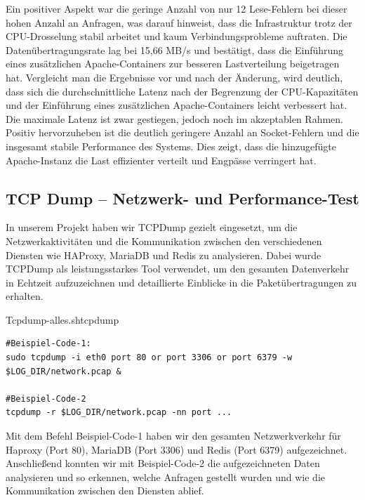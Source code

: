 Ein positiver Aspekt war die geringe Anzahl von nur 12 Lese-Fehlern bei dieser hohen Anzahl an Anfragen, was darauf hinweist, dass die Infrastruktur trotz der CPU-Drosselung stabil arbeitet und kaum Verbindungsprobleme auftraten. Die Datenübertragungsrate lag bei 15,66 MB/s und bestätigt, dass die Einführung eines zusätzlichen Apache-Containers zur besseren Lastverteilung beigetragen hat.
Vergleicht man die Ergebnisse vor und nach der Änderung, wird deutlich, dass sich die durchschnittliche Latenz nach der Begrenzung der CPU-Kapazitäten und der Einführung eines zusätzlichen Apache-Containers leicht verbessert hat. Die maximale Latenz ist zwar gestiegen, jedoch noch im akzeptablen Rahmen. Positiv hervorzuheben ist die deutlich geringere Anzahl an Socket-Fehlern und die insgesamt stabile Performance des Systems. Dies zeigt, dass die hinzugefügte Apache-Instanz die Last effizienter verteilt und Engpässe verringert hat.


\subsection{TCP Dump – Netzwerk- und Performance-Test}
In unserem Projekt haben wir TCPDump gezielt eingesetzt, um die Netzwerkaktivitäten und die Kommunikation zwischen den verschiedenen Diensten wie HAProxy, MariaDB und Redis zu analysieren. Dabei wurde TCPDump als leistungsstarkes Tool verwendet, um den gesamten Datenverkehr in Echtzeit aufzuzeichnen und detaillierte Einblicke in die Paketübertragungen zu erhalten.

\begin{code}{Tcpdump-alles.sh}{tcpdump}
        \begin{verbatim}
#Beispiel-Code-1:
sudo tcpdump -i eth0 port 80 or port 3306 or port 6379 -w $LOG_DIR/network.pcap &

#Beispiel-Code-2  
tcpdump -r $LOG_DIR/network.pcap -nn port ...

        \end{verbatim}
\end{code}

Mit dem Befehl  Beispiel-Code-1   haben wir den gesamten Netzwerkverkehr für Haproxy (Port 80), MariaDB (Port 3306) und Redis (Port 6379) aufgezeichnet. Anschließend konnten wir mit Beispiel-Code-2 die aufgezeichneten Daten analysieren und so erkennen, welche Anfragen gestellt wurden und wie die Kommunikation zwischen den Diensten ablief.

